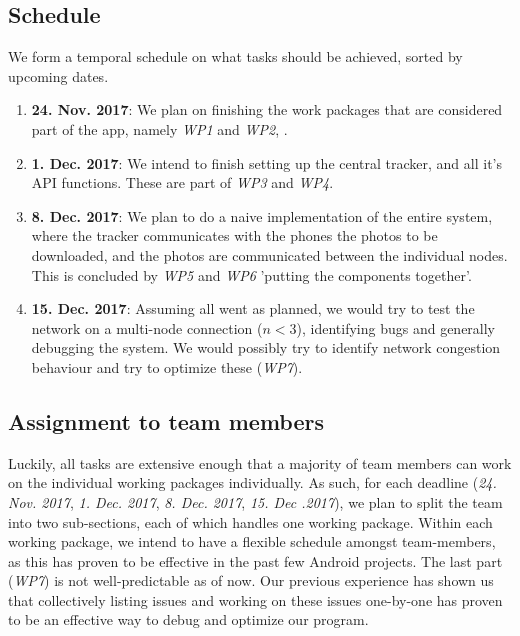 \documentclass{report}
\begin{document}
\subsection{Schedule}
We form a temporal schedule on what tasks should be achieved, sorted by upcoming dates.
\begin{enumerate}
\item  \textbf{24. Nov. 2017}: We plan on finishing the work packages that are considered part of the app, namely \textit{WP1} and \textit{WP2}, .
\item  \textbf{1. Dec. 2017}: We intend to finish setting up the central tracker, and all it's API functions. These are part of \textit{WP3} and \textit{WP4}.
\item \textbf{8. Dec. 2017}: We plan to do a naive implementation of the entire system, where the tracker communicates with the phones the photos to be downloaded, and the photos are communicated between the individual nodes. This is concluded by \textit{WP5} and  \textit{WP6} 'putting the components together'.
\item \textbf{15. Dec. 2017}: Assuming all went as planned, we would try to test the network on a multi-node connection ($n < 3$), identifying bugs and generally debugging the system. 
We would possibly try to identify network congestion behaviour and try to optimize these (\textit{WP7}).
\end{enumerate}


\subsection{Assignment to team members}
Luckily, all tasks are extensive enough that a majority of team members can work on the individual working packages individually. 
As such, for each deadline (\textit{24. Nov. 2017}, \textit{1. Dec. 2017}, \textit{8. Dec. 2017}, \textit{15. Dec .2017}), we plan to split the team into two sub-sections, each of which handles one working package. Within each working package, we intend to have a flexible schedule amongst team-members, as this has proven to be effective in the past few Android projects. 
The last part (\textit{WP7}) is not well-predictable as of now. 
Our previous experience has shown us that collectively listing issues and working on these issues one-by-one has proven to be an effective way to debug and optimize our program.



\end{document}
